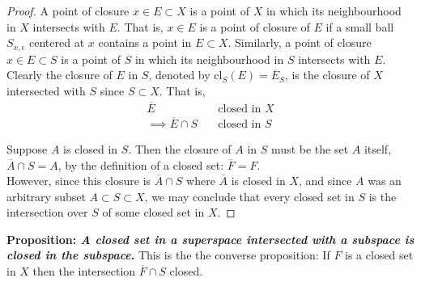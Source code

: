 \documentclass[12pt]{article}
\newlength\tindent
\renewcommand{\indent}{\hspace*{\tindent}}
\newcommand{\cl}{\mathrm{cl}} %
\begin{document}
\begin{proof} A point of closure $x \in E \subset X$ is a point of $X$ in which its neighbourhood in $X$ intersects with $E$. That is, $x \in E$ is a point of closure of $E$ if a small ball $S_{x,\epsilon}$ centered at $x$ contains a point in $E \subset X$. Similarly, a point of closure $x \in E \subset S$ is a point of $S$ in which its neighbourhood in $S$ intersects with $E$. \\

\indent Clearly the closure of $E$ in $S$, denoted by $\cl_S(E) = \overline{E}_S$, is the closure of $X$ intersected with $S$ since $S \subset X$. That is,
\begin{align*}
	\overline{E} &\quad \text{closed in $X$} \\
	\implies \overline{E} \cap S &\quad \text{closed in $S$}
\end{align*}

\indent Suppose $A$ is closed in $S$. Then the closure of $A$ in $S$ must be the set $A$ itself, $\overline{A} \cap S = A$, by the definition of a closed set: $\overline{F} = F$. \\

\indent However, since this closure is $\overline{A} \cap S$ where $\overline{A}$ is closed in $X$, and since $A$ was an arbitrary subset $A \subset S \subset X$, we may conclude that every closed set in $S$ is the intersection over $S$ of some closed set in $X$. 
\end{proof} \hfill

%
%
{\bf Proposition: {\em A closed set in a superspace intersected with a subspace is closed in the subspace}.} This is the the converse proposition: If $F$ is a closed set in $X$ then the intersection $\overline{F} \cap S$ closed. 
\end{document}
